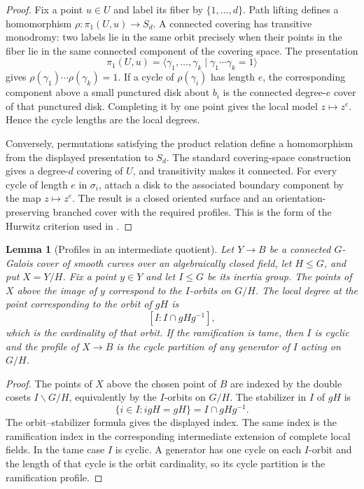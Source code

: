 \documentclass[11pt]{amsart}
\theoremstyle{plain}
\newtheorem{lemma}[theorem]{Lemma}
\theoremstyle{definition}
\numberwithin{equation}{section}
\begin{document}
\begin{proof}
Fix a point $u\in U$ and label its fiber by $\{1,\ldots,d\}$.  Path lifting
defines a homomorphism $\rho:\pi_1(U,u)\to S_d$.  A connected covering has
transitive monodromy: two labels lie in the same orbit precisely when their
points in the fiber lie in the same connected component of the covering
space.  The presentation
\[
 \pi_1(U,u)=
 \langle\gamma_1,\ldots,\gamma_k\mid
   \gamma_1\cdots\gamma_k=1\rangle
\]
gives $\rho(\gamma_1)\cdots\rho(\gamma_k)=1$.  If a cycle of
$\rho(\gamma_i)$ has length $e$, the corresponding component above a small
punctured disk about $b_i$ is the connected degree-$e$ cover of that
punctured disk.  Completing it by one point gives the local model
$z\mapsto z^e$.  Hence the cycle lengths are the local degrees.

Conversely, permutations satisfying the product relation define a
homomorphism from the displayed presentation to $S_d$.  The standard
covering-space construction gives a degree-$d$ covering of $U$, and
transitivity makes it connected.  For every cycle of length $e$ in
$\sigma_i$, attach a disk to the associated boundary component by the map
$z\mapsto z^e$.  The result is a closed oriented surface and an
orientation-preserving branched cover with the required profiles.  This is
the form of the Hurwitz criterion used in \cite[Lemma~2.1]{EKS}.
\end{proof}

\begin{lemma}[Profiles in an intermediate quotient]
\label{lem:quotient-profile}
Let $Y\to B$ be a connected $G$-Galois cover of smooth curves over an
algebraically closed field, let $H\leq G$, and put $X=Y/H$.  Fix a point
$y\in Y$ and let $I\leq G$ be its inertia group.  The points of $X$ above
the image of $y$ correspond to the $I$-orbits on $G/H$.  The local degree at
the point corresponding to the orbit of $gH$ is
\[
 [I:I\cap gHg^{-1}],
\]
which is the cardinality of that orbit.  If the ramification is tame, then
$I$ is cyclic and the profile of $X\to B$ is the cycle partition of any
generator of $I$ acting on $G/H$.
\end{lemma}

\begin{proof}
The points of $X$ above the chosen point of $B$ are indexed by the double
cosets $I\backslash G/H$, equivalently by the $I$-orbits on $G/H$.  The
stabilizer in $I$ of $gH$ is
\[
 \{i\in I:igH=gH\}=I\cap gHg^{-1}.
\]
The orbit--stabilizer formula gives the displayed index.  The same index is
the ramification index in the corresponding intermediate extension of
complete local fields.  In the tame case $I$ is cyclic.  A generator has
one cycle on each $I$-orbit and the length of that cycle is the orbit
cardinality, so its cycle partition is the ramification profile.
\end{proof}
\end{document}
